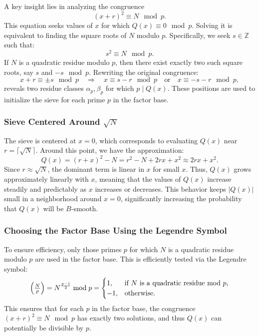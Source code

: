 \documentclass[a4paper, 11pt]{article}
\begin{document}
A key insight lies in analyzing the congruence
\begin{equation}
(x + r)^2 \equiv N \mod p.
\end{equation}
This equation seeks values of $x$ for which $Q(x) \equiv 0 \mod p$. Solving it is equivalent to finding the square roots of $N$ modulo $p$. Specifically, we seek $s \in \mathbb{Z}$ such that:
\begin{equation}
s^2 \equiv N \mod p.
\end{equation}
If $N$ is a quadratic residue modulo $p$, then there exist exactly two such square roots, say $s$ and $-s \mod p$. Rewriting the original congruence:
\begin{equation}
x + r \equiv \pm s \mod p \quad \Longrightarrow \quad
x \equiv s - r \mod p \quad \text{or} \quad x \equiv -s - r \mod p,
\end{equation}
reveals two residue classes $\alpha_p, \beta_p$ for which $p \mid Q(x)$. These positions are used to initialize the sieve for each prime $p$ in the factor base.

\subsubsection{Sieve Centered Around $\sqrt{N}$}

The sieve is centered at $x = 0$, which corresponds to evaluating $Q(x)$ near $r = \lceil \sqrt{N} \rceil$. Around this point, we have the approximation:
\begin{equation}
Q(x) = (r + x)^2 - N = r^2 - N + 2rx + x^2 \approx 2rx + x^2.
\end{equation}
Since $r \approx \sqrt{N}$, the dominant term is linear in $x$ for small $x$. Thus, $Q(x)$ grows approximately linearly with $x$, meaning that the values of $Q(x)$ increase steadily and predictably as $x$ increases or decreases. This behavior keeps $|Q(x)|$ small in a neighborhood around $x = 0$, significantly increasing the probability that $Q(x)$ will be $B$-smooth.

\subsubsection{Choosing the Factor Base Using the Legendre Symbol}

To ensure efficiency, only those primes $p$ for which $N$ is a quadratic residue modulo $p$ are used in the factor base. This is efficiently tested via the Legendre symbol:
\begin{equation}
\Bigl(\tfrac{N}{p}\Bigr) = N^{\frac{p-1}{2}} \bmod p =
\begin{cases}
1, & \text{if } N \text{ is a quadratic residue mod } p, \\
-1, & \text{otherwise}.
\end{cases}
\end{equation}
This ensures that for each $p$ in the factor base, the congruence $(x + r)^2 \equiv N \mod p$ has exactly two solutions, and thus $Q(x)$ can potentially be divisible by $p$.
\end{document}
